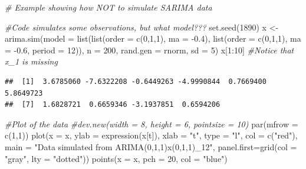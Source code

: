 \documentclass[
]{book}
\newenvironment{Shaded}{\begin{snugshade}}{\end{snugshade}}
\newcommand{\AttributeTok}[1]{\textcolor[rgb]{0.77,0.63,0.00}{#1}}
\newcommand{\CommentTok}[1]{\textcolor[rgb]{0.56,0.35,0.01}{\textit{#1}}}
\newcommand{\DecValTok}[1]{\textcolor[rgb]{0.00,0.00,0.81}{#1}}
\newcommand{\FloatTok}[1]{\textcolor[rgb]{0.00,0.00,0.81}{#1}}
\newcommand{\FunctionTok}[1]{\textcolor[rgb]{0.00,0.00,0.00}{#1}}
\newcommand{\NormalTok}[1]{#1}
\newcommand{\OtherTok}[1]{\textcolor[rgb]{0.56,0.35,0.01}{#1}}
\newcommand{\SpecialCharTok}[1]{\textcolor[rgb]{0.00,0.00,0.00}{#1}}
\newcommand{\StringTok}[1]{\textcolor[rgb]{0.31,0.60,0.02}{#1}}
\theoremstyle{definition}
\theoremstyle{definition}
\theoremstyle{definition}
\theoremstyle{definition}
\theoremstyle{remark}
\begin{document}
\begin{Shaded}
\begin{Highlighting}[]
\CommentTok{\# Example showing how NOT to simulate SARIMA data}

  \CommentTok{\#Code simulates some observations, but what model??? }
  \FunctionTok{set.seed}\NormalTok{(}\DecValTok{1890}\NormalTok{)}
\NormalTok{  x }\OtherTok{\textless{}{-}} \FunctionTok{arima.sim}\NormalTok{(}\AttributeTok{model =} \FunctionTok{list}\NormalTok{(}\FunctionTok{list}\NormalTok{(}\AttributeTok{order =} \FunctionTok{c}\NormalTok{(}\DecValTok{0}\NormalTok{,}\DecValTok{1}\NormalTok{,}\DecValTok{1}\NormalTok{), }\AttributeTok{ma =} \SpecialCharTok{{-}}\FloatTok{0.4}\NormalTok{), }\FunctionTok{list}\NormalTok{(}\AttributeTok{order =} \FunctionTok{c}\NormalTok{(}\DecValTok{0}\NormalTok{,}\DecValTok{1}\NormalTok{,}\DecValTok{1}\NormalTok{), }\AttributeTok{ma =} \SpecialCharTok{{-}}\FloatTok{0.6}\NormalTok{, }\AttributeTok{period =} \DecValTok{12}\NormalTok{)),}
    \AttributeTok{n =} \DecValTok{200}\NormalTok{, }\AttributeTok{rand.gen =}\NormalTok{ rnorm, }\AttributeTok{sd =} \DecValTok{5}\NormalTok{)}
\NormalTok{  x[}\DecValTok{1}\SpecialCharTok{:}\DecValTok{10}\NormalTok{] }\CommentTok{\#Notice that x\_1 is missing}
\end{Highlighting}
\end{Shaded}

\begin{verbatim}
##  [1]  3.6785060 -7.6322208 -0.6449263 -4.9990844  0.7669400  5.8649723
##  [7]  1.6828721  0.6659346 -3.1937851  0.6594206
\end{verbatim}

\begin{Shaded}
\begin{Highlighting}[]
\CommentTok{\#Plot of the data}
  \CommentTok{\#dev.new(width = 8, height = 6, pointsize = 10)}
  \FunctionTok{par}\NormalTok{(}\AttributeTok{mfrow =} \FunctionTok{c}\NormalTok{(}\DecValTok{1}\NormalTok{,}\DecValTok{1}\NormalTok{))}
  \FunctionTok{plot}\NormalTok{(}\AttributeTok{x =}\NormalTok{ x, }\AttributeTok{ylab =} \FunctionTok{expression}\NormalTok{(x[t]), }\AttributeTok{xlab =} \StringTok{"t"}\NormalTok{, }\AttributeTok{type =} \StringTok{"l"}\NormalTok{, }\AttributeTok{col =} \FunctionTok{c}\NormalTok{(}\StringTok{"red"}\NormalTok{),  }
        \AttributeTok{main =}  \StringTok{"Data simulated from ARIMA(0,1,1)x(0,1,1)\_12"}\NormalTok{,}
        \AttributeTok{panel.first=}\FunctionTok{grid}\NormalTok{(}\AttributeTok{col =} \StringTok{"gray"}\NormalTok{, }\AttributeTok{lty =} \StringTok{"dotted"}\NormalTok{))}
  \FunctionTok{points}\NormalTok{(}\AttributeTok{x =}\NormalTok{ x, }\AttributeTok{pch =} \DecValTok{20}\NormalTok{, }\AttributeTok{col =} \StringTok{"blue"}\NormalTok{)}
\end{Highlighting}
\end{Shaded}
\end{document}
